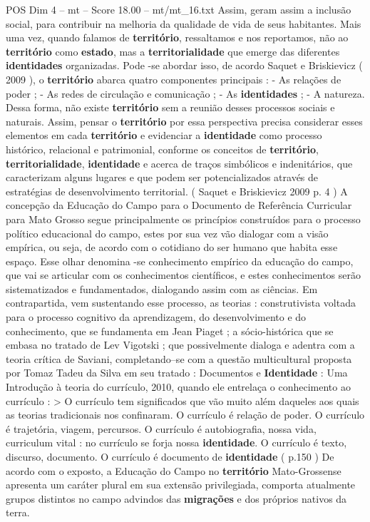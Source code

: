 \begin{textsample}{POS Dim 4 – mt – Score 18.00 – mt/mt\_16.txt}
Assim, geram assim a inclusão social, para contribuir na melhoria da qualidade de vida de seus habitantes.
Mais uma vez, quando falamos de \textbf{território}, ressaltamos e nos reportamos, não ao \textbf{território} como \textbf{estado}, mas a \textbf{territorialidade} que emerge das diferentes \textbf{identidades} organizadas.
Pode -se abordar isso, de acordo Saquet e Briskievicz ( 2009 ), o \textbf{território} abarca quatro componentes principais : - As relações de poder ; - As redes de circulação e comunicação ; - As \textbf{identidades} ; - A natureza.
Dessa forma, não existe \textbf{território} sem a reunião desses processos sociais e naturais.
Assim, pensar o \textbf{território} por essa perspectiva precisa considerar esses elementos em cada \textbf{território} e evidenciar a \textbf{identidade} como processo histórico, relacional e patrimonial, conforme os conceitos de \textbf{território}, \textbf{territorialidade}, \textbf{identidade} e acerca de traços simbólicos e indenitários, que caracterizam alguns lugares e que podem ser potencializados através de estratégias de desenvolvimento territorial. ( Saquet e Briskievicz 2009 p. 4 ) A concepção da Educação do Campo para o Documento de Referência Curricular para Mato Grosso segue principalmente os princípios construídos para o processo político educacional do campo, estes por sua vez vão dialogar com a visão empírica, ou seja, de acordo com o cotidiano do ser humano que habita esse espaço.
Esse olhar denomina -se conhecimento empírico da educação do campo, que vai se articular com os conhecimentos científicos, e estes conhecimentos serão sistematizados e fundamentados, dialogando assim com as ciências.
Em contrapartida, vem sustentando esse processo, as teorias : construtivista voltada para o processo cognitivo da aprendizagem, do desenvolvimento e do conhecimento, que se fundamenta em Jean Piaget ; a sócio-histórica que se embasa no tratado de Lev Vigotski ; que possivelmente dialoga e adentra com a teoria crítica de Saviani, completando–se com a questão multicultural proposta por Tomaz Tadeu da Silva em seu tratado : Documentos e \textbf{Identidade} : Uma Introdução à teoria do currículo, 2010, quando ele entrelaça o conhecimento ao currículo : > O currículo tem significados que vão muito além daqueles aos quais as teorias tradicionais nos confinaram.
O currículo é relação de poder.
O currículo é trajetória, viagem, percursos.
O currículo é autobiografia, nossa vida, curriculum vital : no currículo se forja nossa \textbf{identidade}.
O currículo é texto, discurso, documento.
O currículo é documento de \textbf{identidade} ( p.150 ) De acordo com o exposto, a Educação do Campo no \textbf{território} Mato-Grossense apresenta um caráter plural em sua extensão privilegiada, comporta atualmente grupos distintos no campo advindos das \textbf{migrações} e dos próprios nativos da terra.

\end{textsample}

